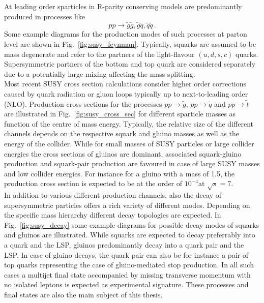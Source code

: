 At leading order sparticles in R-parity conserving models are predominantly produced in processes like~\cite{Kane:1982hw, Harrison:1982yi, Reya:1984yz, Dawson:1983fw, Baer:1985xz}
\begin{equation}
 pp \rightarrow \tilde{g}\tilde{g}, \tilde{g}\tilde{q}, \tilde{q}\tilde{q} \, .
\end{equation}
Some example diagrams for the production modes of such processes at parton level are shown in Fig.~\ref{fig:susy_feynman}. Typically, squarks are assumed to be mass degenerate and refer to the partners of the light-flavour $(u, d, s, c)$ quarks. Supersymmetric partners of the bottom and top quark are considered separately due to a potentially large mixing affecting the mass splitting.\\
Most recent SUSY cross section calculations consider higher order corrections caused \eg by quark radiation or gluon loops typically up to next-to-leading order (NLO). Production cross sections for the processes $pp \rightarrow \tilde{g}$, $pp \rightarrow \tilde{q}$ and $pp \rightarrow \tilde{t}$ are illustrated in Fig.~\ref{fig:susy_cross_sec} for different sparticle masses as function of the centre of mass energy. Typically, the relative size of the different channels depends on the respective squark and gluino masses as well as the energy of the collider. While for small masses of SUSY particles or large collider energies the cross sections of gluinos are dominant, associated squark-gluino production and squark-pair production are favoured in case of large SUSY masses and low collider energies. For instance for a gluino with a mass of 1.5\tev, the production cross section is expected to be at the order of $10^{-4}$\pb at $\sqrt{s} = 7$\tev.\\
In addition to various different production channels, also the decay of supersymmetric particles offers a rich variety of different modes. Depending on the specific mass hierarchy different decay topologies are expected. In Fig.~\ref{fig:susy_decay} some example diagrams for possible decay modes of squarks and gluinos are illustrated. While squarks are expected to decay preferrably into a quark and the LSP, gluinos predominantly decay into a quark pair and the LSP. In case of gluino decays, the quark pair can also be for instance a pair of top quarks representing the case of gluino-mediated stop production. In all such cases a multijet final state accompanied by missing transverse momentum with no isolated leptons is expected as experimental signature. These processes and final states are also the main subject of this thesis.\\ 
